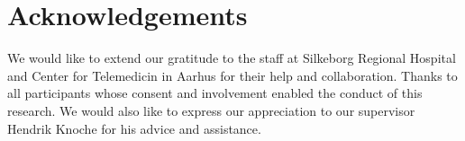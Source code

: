 \section{Acknowledgements}
We would like to extend our gratitude to the staff at Silkeborg Regional Hospital and Center for Telemedicin in Aarhus for their help and collaboration. Thanks to all participants whose consent and involvement enabled the conduct of this research. We  would also like to express our appreciation to our supervisor Hendrik Knoche for his advice and assistance.